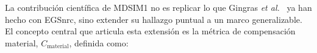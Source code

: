 \documentclass[11pt,a4paper]{article}
\begin{document}


La contribución científica de MDSIM1 no es replicar lo que Gingras \textit{et al.}~\cite{gingras2025} ya han hecho con EGSnrc, sino extender su hallazgo puntual a un marco generalizable. El concepto central que articula esta extensión es la métrica de compensación material, $C_{\mathrm{material}}$, definida como:
\end{document}
